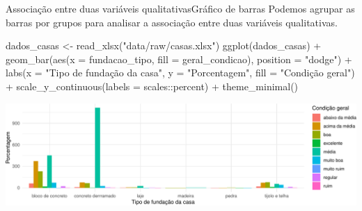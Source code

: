 \documentclass[
  10pt,
  ignorenonframetext,
]{beamer}
\newenvironment{Shaded}{}{}
\newcommand{\DataTypeTok}[1]{#1}
\newcommand{\KeywordTok}[1]{\textcolor[rgb]{0.00,0.00,1.00}{#1}}
\newcommand{\NormalTok}[1]{#1}
\newcommand{\OperatorTok}[1]{#1}
\newcommand{\StringTok}[1]{\textcolor[rgb]{0.00,0.50,0.50}{#1}}
\begin{document}
\begin{frame}[fragile]{Associação entre duas variáveis
qualitativas\newline Gráfico de barras}
\protect\hypertarget{associauxe7uxe3o-entre-duas-variuxe1veis-qualitativasgruxe1fico-de-barras-1}{}
Podemos agrupar as barras por grupos para analisar a associação entre
duas variáveis qualitativas.

\small

\begin{Shaded}
\begin{Highlighting}[]
\NormalTok{dados\_casas \textless{}{-}}\StringTok{ }\KeywordTok{read\_xlsx}\NormalTok{(}\StringTok{"data/raw/casas.xlsx"}\NormalTok{)}
\KeywordTok{ggplot}\NormalTok{(dados\_casas) }\OperatorTok{+}
\StringTok{  }\KeywordTok{geom\_bar}\NormalTok{(}\KeywordTok{aes}\NormalTok{(}\DataTypeTok{x =}\NormalTok{ fundacao\_tipo, }\DataTypeTok{fill =}\NormalTok{ geral\_condicao),}
          \DataTypeTok{position =} \StringTok{"dodge"}\NormalTok{) }\OperatorTok{+}
\StringTok{  }\KeywordTok{labs}\NormalTok{(}\DataTypeTok{x =} \StringTok{"Tipo de fundação da casa"}\NormalTok{, }\DataTypeTok{y =} \StringTok{"Porcentagem"}\NormalTok{,}
      \DataTypeTok{fill =} \StringTok{"Condição geral"}\NormalTok{) }\OperatorTok{+}
\StringTok{  }\KeywordTok{scale\_y\_continuous}\NormalTok{(}\DataTypeTok{labels =}\NormalTok{ scales}\OperatorTok{::}\NormalTok{percent) }\OperatorTok{+}
\StringTok{  }\KeywordTok{theme\_minimal}\NormalTok{()}
\end{Highlighting}
\end{Shaded}

\normalsize
\end{frame}

\begin{frame}
\begin{center}\includegraphics[width=1\linewidth]{aulas_files/figure-beamer/unnamed-chunk-77-1} \end{center}
\end{frame}
\end{document}
